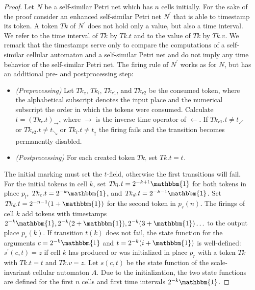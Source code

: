 \documentclass[pre,showpacs,showkeys,preprint]{revtex4}
\theoremstyle{definition}
\begin{document}
\begin{proof}
Let $N$ be a self-similar Petri net which has $n$ cells initially.
For the sake of the proof consider an enhanced self-similar Petri net $N^\prime$ that is able to timestamp its token.
A token $\mathit{Tk}$ of $N^\prime$ does not hold only a value, but also a time interval.
We refer to the time interval of $\mathit{Tk}$ by $\mathit{Tk}.t$ and to the value of $\mathit{Tk}$ by $\mathit{Tk}.v$.
We remark that the timestamps serve only to compare the computations of a self-similar cellular automaton and a self-similar Petri net and do not imply any time behavior of the self-similar Petri net.
The firing rule of $N^\prime$ works as for $N$, but has an additional pre- and postprocessing step:
\begin{itemize}
\item \emph{(Preprocessing)}
Let $\mathit{Tk}_c$, $\mathit{Tk}_l$, $\mathit{Tk}_{r1}$, and $\mathit{Tk}_{r2}$ be the consumed token, where the alphabetical subscript denotes
the input place and the numerical subscript the order in which the tokens were consumed.
Calculate $t = (\mathit{Tk}_c.t)_\rightarrow$, where $\rightarrow$ is the inverse time operator of $\leftarrow$.
If $\mathit{Tk}_{r1}.t \neq t_\swarrow$ or $\mathit{Tk}_{r2}.t \neq t_\searrow$ or $\mathit{Tk}_{l}.t \neq t_\uparrow$ the firing fails
and the transition becomes permanently disabled.
\item \emph{(Postprocessing)}
For each created token $\mathit{Tk}$, set $\mathit{Tk}.t = t$.
\end{itemize}
The initial marking must set the $t$-field, otherwise the first transitions will fail.
For the initial tokens in cell $k$,
set $\mathit{Tk}_l.t = 2^{-k+1} \mathbbm{1}$ for both tokens in place $p_l$, $\mathit{Tk}_c.t = 2^{-k} \mathbbm{1}$,
and $\mathit{Tk}_d.t = 2^{-k-1} \mathbbm{1}$.
Set $\mathit{Tk}_d.t = 2^{-n-1} (1 + \mathbbm{1})$ for the second token in $p_r(n)$.
The firings of cell $k$ add tokens with timestamps $2^{-k} \mathbbm{1}, 2^{-k} (2 + \mathbbm{1}), 2^{-k} (3 + \mathbbm{1}) \ldots$
to the output place $p_c(k)$.
If transition $t(k)$ does not fail, the state function for the arguments $c=2^{-k} \mathbbm{1}$ and $t=2^{-k} (i + \mathbbm{1})$ is well-defined:
$s^\prime(c,t) = z$ if cell $k$ has produced or was initialized in place $p_r$ with a token $\mathit{Tk}$ with $\mathit{Tk}.t = t$ and $\mathit{Tk}.v = z$.
Let $s(c,t)$ be the state function of the scale-invariant cellular automaton $A$.
Due to the initialization, the two state functions are defined for the first $n$ cells and first time intervals $2^{-k} \mathbbm{1}$.

\end{proof}
\end{document}
